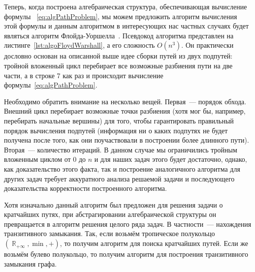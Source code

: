 Теперь, когда построена алгебраическая структура, обеспечивающая вычисление формулы~
\ref{eq:algPathProblem}, мы можем предложить алгоритм вычисления этой формулы и данным алгоритмом в интересующих нас частных случаях будет являться алгоритм Флойда-Уоршелла~.
Псевдокод алгоритма представлен на листинге~\ref{lst:algoFloydWarshall}, а его сложность $O(n^3)$.
Он практически дословно основан на описанной выше идее сборки путей из двух подпутей: тройной вложенный цикл перебирает все возможные разбиения пути на две части, а в строке 7 как раз и происходит вычисление формулы~\ref{eq:algPathProblem}.

Необходимо обратить внимание на несколько вещей.
Первая~--- порядок обхода.
Внешний цикл перебирает возможные точки разбиения (хотя мог бы, например, перебирать начальные вершины) для того, чтобы гарантировать правильный порядок вычисления подпутей (информация ни о каких подпутях не будет получена после того, как они поучаствовали в построении более длинного пути).
Вторая~--- количество итераций.
В данном случае мы ограничились тройным вложенным циклом от 0 до $n$ и для наших задач этого будет достаточно, однако, как доказательство этого факта, так и построение аналогичного алгоритма для других задач требует аккуратного анализа решаемой задачи и последующего доказательства корректности построенного алгоритма.


Хотя изначально данный алгоритм был предложен для решения задачи о кратчайших путях, при абстрагировании алгебраической структуры он превращается в алгоритм решения целого ряда задач.
В частности~--- нахождения транзитивного замыкания.
Так, если возьмём тропическое полукольцо $(\BbbR_{+\infty}, \min, +)$, то получим алгоритм для поиска кратчайших путей.
Если же возьмём булево полукольцо, то получим алгоритм для построения транзитивного замыкания графа.

